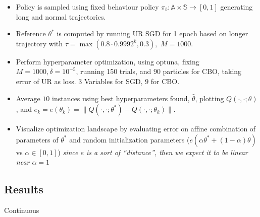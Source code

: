 \documentclass[11pt]{article}
\begin{document}
\begin{itemize}
    \item
      Policy is sampled using fixed behaviour policy
      $\pi_b:\mathbb A\times \mathbb S\rightarrow[0,1]$ generating long
      and normal trajectories.
    \item
      Reference $\theta^*$ is computed by running UR SGD for 1 epoch based
      on longer trajectory with $\tau=\max(0.8\cdot 0.9992^k, 0.3),$
      $M=1000$.
    \item
      Perform hyperparameter optimization, using optuna, fixing
      $M=1000, \delta = 10^{-5}$, running 150 trials, and $90$ particles
      for CBO, taking error of UR as loss. $3$ Variables for SGD, $9$
      for CBO.
    \item
      Average $10$ instances using best hyperparameters found,
      $\hat\theta$, plotting $Q(\cdot,\cdot;\theta)$, and
      $e_k=e(\theta_k)=\|Q(\cdot, \cdot;\theta^*)-Q(\cdot, \cdot;\theta_k)\|$.
    \item
      Visualize optimization landscape by evaluating error on affine
      combination of parameters of $\theta^*$ and random initialization
      parameters ($e(\alpha\theta^*+(1-\alpha)\theta)$ vs
      $\alpha\in[0,1]$) \emph{since $e$ is a sort of ``distance'', then
      we expect it to be linear near $\alpha=1$}
 \end{itemize}


\subsection{Results}

Continuous
\end{document}
